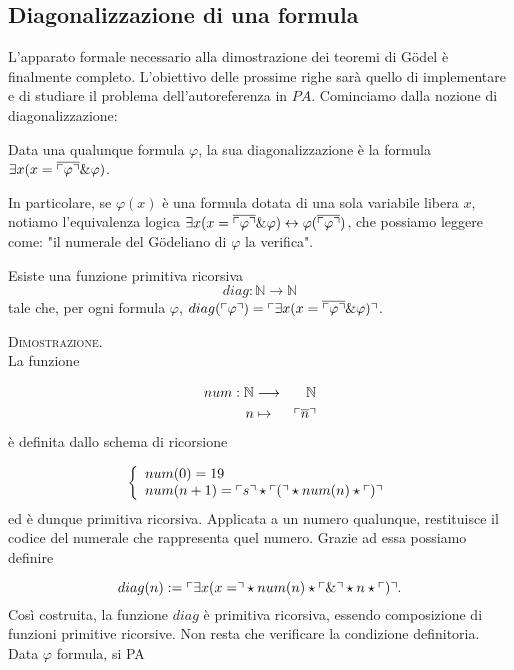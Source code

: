 \subsection{Diagonalizzazione di una formula}
	L'apparato formale necessario alla dimostrazione dei teoremi di
	G\"odel \`e finalmente completo. L'obiettivo delle prossime
	righe sar\`a quello di implementare e di studiare il problema
	dell'autoreferenza in $PA$. Cominciamo dalla nozione di
	diagonalizzazione:

	\begin{defi}Data una qualunque formula $\varphi$, la sua
	diagonalizzazione \`e la formula $\exists x(x=\overline
	{\ulcorner \varphi \urcorner} \& \varphi)$.
	\end{defi}
	In particolare, se $\varphi(x)$ \`e una formula dotata di una
	sola variabile libera $x$, notiamo l'equivalenza logica $\exists
	x(x=\overline{\ulcorner \varphi \urcorner} \& \varphi)\leftrightarrow\varphi
	(\overline{\ulcorner \varphi \urcorner})$, che possiamo leggere come: "il
	numerale del G\"odeliano di $\varphi$ la verifica".

	\begin{prop}
	\label{pro:funPriRic}
	Esiste una funzione primitiva ricorsiva $$diag:\mathbb{N}\rightarrow\mathbb{N}$$
	tale che, per ogni formula $\varphi$, $diag(\ulcorner \varphi \urcorner)=\ulcorner \exists
	x(x=\overline{\ulcorner \varphi \urcorner} \& \varphi) \urcorner$.
	\end{prop}
	
	\textsc{Dimostrazione.}\\
	La funzione
	
	\begin{eqnarray*}
	num: \mathbb{N} & \longrightarrow & \mathbb{N}\\
	n &\mapsto& \ulcorner \overline{n} \urcorner
	\end{eqnarray*}
	\`e definita dallo schema di ricorsione
	
	$$
	\left\{\begin{array}{l}
	num(0)=19\\
	num(n+1)=\ulcorner s \urcorner \star \ulcorner ( \urcorner \star num(n) \star\ulcorner ) \urcorner
	\end{array}\right.
	$$
	ed \`e dunque primitiva ricorsiva. Applicata a un numero qualunque,
	restituisce il codice del numerale che rappresenta quel numero.
	Grazie ad essa possiamo definire
	
	$$
	diag(n):=\ulcorner \exists x(x= \urcorner\star num(n)\star\ulcorner \& \urcorner\star n\star\ulcorner ) \urcorner.
	$$
	Cos\`i costruita, la funzione $diag$ \`e primitiva ricorsiva,
	essendo composizione di funzioni primitive ricorsive. Non resta
	che verificare la condizione definitoria. Data $\varphi$ formula,
	si PA
	
